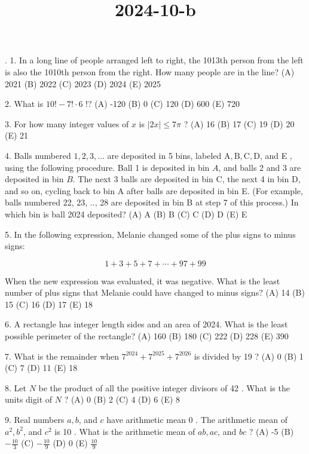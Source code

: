 \documentclass[12pt,a4paper]{book}
\title{2024-10-b}
\theoremstyle{definition}
\begin{document}
. 1. In a long line of people arranged left to right, the 1013th person from the left is also the 1010th person from the right. How many people are in the line?
(A) 2021
(B) 2022
(C) 2023
(D) 2024
(E) 2025

2. What is $10!-7!\cdot 6$ !?
(A) -120
(B) 0
(C) 120
(D) 600
(E) 720

3. For how many integer values of $x$ is $|2 x| \leq 7 \pi$ ?
(A) 16
(B) 17
(C) 19
(D) 20
(E) 21

4. Balls numbered $1,2,3, \ldots$ are deposited in 5 bins, labeled $\mathrm{A}, \mathrm{B}, \mathrm{C}, \mathrm{D}$, and E , using the following procedure. Ball 1 is deposited in bin $A$, and balls 2 and 3 are deposited in bin $B$. The next 3 balls are deposited in bin C, the next 4 in bin D, and so on, cycling back to bin A after balls are deposited in bin E. (For example, balls numbered 22, 23, .., 28 are deposited in bin B at step 7 of this process.) In which bin is ball 2024 deposited?
(A) A
(B) B
(C) C
(D) D
(E) E

5. In the following expression, Melanie changed some of the plus signs to minus signs:

$$
1+3+5+7+\cdots+97+99
$$


When the new expression was evaluated, it was negative. What is the least number of plus signs that Melanie could have changed to minus signs?
(A) 14
(B) 15
(C) 16
(D) 17
(E) 18

6. A rectangle has integer length sides and an area of 2024. What is the least possible perimeter of the rectangle?
(A) 160
(B) 180
(C) 222
(D) 228
(E) 390

7. What is the remainder when $7^{2024}+7^{2025}+7^{2026}$ is divided by 19 ?
(A) 0
(B) 1
(C) 7
(D) 11
(E) 18

8. Let $N$ be the product of all the positive integer divisors of 42 . What is the units digit of $N$ ?
(A) 0
(B) 2
(C) 4
(D) 6
(E) 8

9. Real numbers $a, b$, and $c$ have arithmetic mean 0 . The arithmetic mean of $a^2, b^2$, and $c^2$ is 10 . What is the arithmetic mean of $a b, a c$, and $b c$ ?
(A) -5
(B) $-\frac{10}{3}$
(C) $-\frac{10}{9}$
(D) 0
(E) $\frac{10}{9}$
\end{document}
